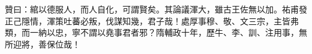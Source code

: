 \begin{pinyinscope}
 贊曰：綰以德服人，而人自化，可謂賢矣。其論議渾大，雖古王佐無以加。祐甫發正己隱情，渾策吐蕃必叛，伐謀知幾，君子哉！處厚事穆、敬、文三宗，主皆弗類，而一納以忠，寧不謂以堯事君者邪？隋輔政十年，歷牛、李、訓、注用事，無所迎將，善保位哉！



\end{pinyinscope}